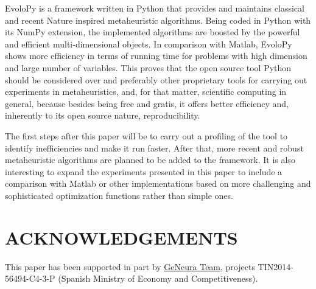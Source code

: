 \documentclass[a4paper,twoside]{article}
\begin{document}
EvoloPy is a framework written in Python that provides and maintains
classical and recent Nature inspired metaheuristic algorithms. Being
coded in Python with its NumPy extension, the implemented algorithms
are boosted by the powerful and efficient multi-dimensional
objects. In comparison with Matlab, EvoloPy shows more efficiency in
terms of running time for problems with  high dimension and large
number of variables. This proves that the open source tool Python
should be considered over and preferably other proprietary tools for
carrying out experiments in metaheuristics, and, for that matter,
scientific computing in general, because besides being free and
gratis, it offers better efficiency and, inherently to its open source
nature, reproducibility. 

The first steps after this paper will be to carry out a profiling of
the tool to identify inefficiencies and make it run faster. After
that, more recent and robust metaheuristic algorithms are
planned to be added to the framework. It is also interesting to expand
the experiments presented in this paper to include a comparison with
Matlab or other implementations based on more challenging and
sophisticated optimization functions rather than simple ones. 

\section{\uppercase{Acknowledgements}}

This paper has been supported in part by
\href{http://geneura.wordpress.com}{GeNeura Team}, 
projects TIN2014-56494-C4-3-P (Spanish Ministry of Economy and
Competitiveness).




{\small
}
\end{document}
